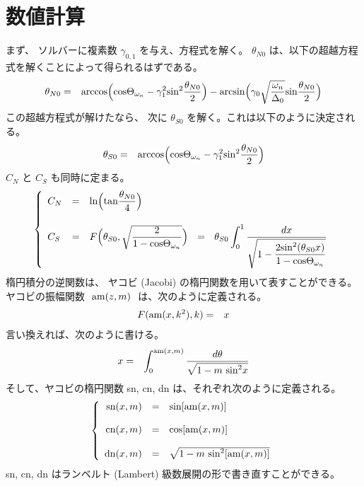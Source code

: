 \documentclass[uplatex,a4j,12pt,dvipdfmx]{jsarticle}
\begin{document}
\section{数値計算}

まず、
ソルバーに複素数 $\gamma_{0,1}$ を与え、方程式を解く。
$\theta_{N0}$ は、以下の超越方程式を解くことによって得られるはずである。
\begin{eqnarray}
	\theta_{N0}
	&=&
	{\rm arccos}
	\Big( {\rm cos} \Theta_{\omega_{n}} - \gamma_{1}^{2} {\rm sin}^{2} \dfrac{\theta_{N0}}{2} \Big)
	-
	{\rm arcsin}
	\Big( \gamma_{0} \sqrt{ \dfrac{\omega_{n}}{\Delta_{0}} } {\rm sin} \dfrac{\theta_{N0}}{2} \Big)
	\label{eqn:theta_N0}
\end{eqnarray}
この超越方程式が解けたなら、
次に $\theta_{S0}$ を解く。これは以下のように決定される。
\begin{eqnarray}
	\theta_{S0}
	&=&
	{\rm arccos}
	\Big( {\rm cos} \Theta_{\omega_{n}} - \gamma_{1}^{2} {\rm sin}^{2} \dfrac{\theta_{N0}}{2} \Big)
\end{eqnarray}
$C_{N}$ と $C_{S}$ も同時に定まる。
\begin{eqnarray}
	\left\{
	\begin{array}{lcl}
		C_{N}
		 & = &
		{\rm ln} \Big( {\rm tan} \dfrac{\theta_{N0}}{4} \Big)
		\\[6mm]
		C_{S}
		 & = &
		F \Big(\theta_{S0} , \sqrt{ \dfrac{2}{ 1 - {\rm cos} \Theta_{\omega_{n}} } } \Big)
		\ \ = \ \
		\displaystyle
		\theta_{S0}
		\int^{1}_{0} \dfrac{d x}{ \sqrt{1 - \dfrac{2 {\rm sin}^{2}(\theta_{S0} x) }{ 1 - {\rm cos} \Theta_{\omega_{n}} } }}
	\end{array}
	\right.
\end{eqnarray}
楕円積分の逆関数は、
ヤコビ (Jacobi) の楕円関数を用いて表すことができる。
ヤコビの振幅関数 $\ {\rm am}(z,m) \ $ は、次のように定義される。
\begin{eqnarray}
	F({\rm am}(x,k^{2}),k)
	&=&
	x
\end{eqnarray}
言い換えれば、次のように書ける。
\begin{eqnarray}
	x
	&=&
	\int^{{\rm am}(x,m)}_{0} \dfrac{d \theta}{ \sqrt{1 - m \ {\rm sin}^{2}x}}
\end{eqnarray}
そして、ヤコビの楕円関数 sn, cn, dn は、それぞれ次のように定義される。
\begin{eqnarray}
	\left\{
	\begin{array}{rcl}
		{\rm sn} (x,m)
		 & = &
		{\rm sin} [{\rm am}(x,m)]
		\\[4mm]
		{\rm cn} (x,m)
		 & = &
		{\rm cos} [{\rm am}(x,m)]
		\\[4mm]
		{\rm dn} (x,m)
		 & = &
		\sqrt{1 - m \ {\rm sin}^{2} [{\rm am}(x,m)]}
	\end{array}
	\right.
\end{eqnarray}
sn, cn, dn はランベルト (Lambert) 級数展開の形で書き直すことができる。
\end{document}
